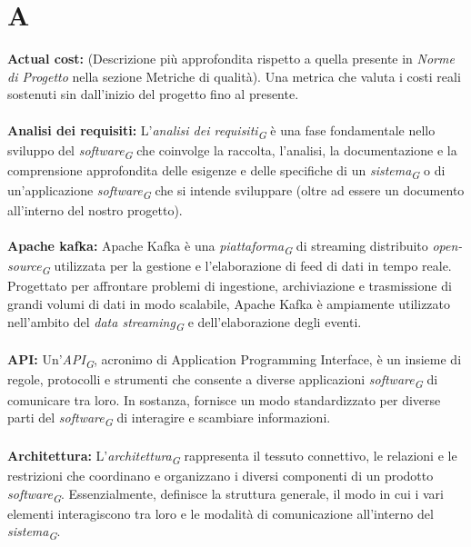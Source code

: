 \documentclass{article}
\begin{document}
\section*{A}
{}
\textbf{Actual cost:} (Descrizione più approfondita rispetto a quella presente in \textit{Norme di Progetto} nella sezione Metriche di qualità). Una metrica che valuta i costi reali sostenuti sin dall'inizio del progetto fino al presente.
\\
\\
\textbf{Analisi dei requisiti:} L'\textit{analisi dei requisiti}\textsubscript{\textit{G}} è una fase fondamentale nello sviluppo del \textit{software}\textsubscript{\textit{G}} che coinvolge la raccolta, l'analisi, la documentazione e la comprensione approfondita delle esigenze e delle specifiche di un \textit{sistema}\textsubscript{\textit{G}} o di un'applicazione \textit{software}\textsubscript{\textit{G}} che si intende sviluppare (oltre ad essere un documento all’interno del nostro progetto).
\\
\\
\textbf{Apache kafka:} Apache Kafka è una \textit{piattaforma}\textsubscript{\textit{G}} di streaming distribuito \textit{open-source}\textsubscript{\textit{G}} utilizzata per la gestione e l'elaborazione di feed di dati in tempo reale. Progettato per affrontare problemi di ingestione, archiviazione e trasmissione di grandi volumi di dati in modo scalabile, Apache Kafka è ampiamente utilizzato nell'ambito del \textit{data streaming}\textsubscript{\textit{G}} e dell'elaborazione degli eventi.
\\
\\
\textbf{API:} Un'\textit{API}\textsubscript{\textit{G}}, acronimo di Application Programming Interface, è un insieme di regole, protocolli e strumenti che consente a diverse applicazioni \textit{software}\textsubscript{\textit{G}} di comunicare tra loro. In sostanza, fornisce un modo standardizzato per diverse parti del \textit{software}\textsubscript{\textit{G}} di interagire e scambiare informazioni.
\\
\\
\textbf{Architettura:} L'\textit{architettura}\textsubscript{\textit{G}} rappresenta il tessuto connettivo, le relazioni e le restrizioni che coordinano e organizzano i diversi componenti di un prodotto \textit{software}\textsubscript{\textit{G}}. Essenzialmente, definisce la struttura generale, il modo in cui i vari elementi interagiscono tra loro e le modalità di comunicazione all'interno del \textit{sistema}\textsubscript{\textit{G}}.
\end{document}
